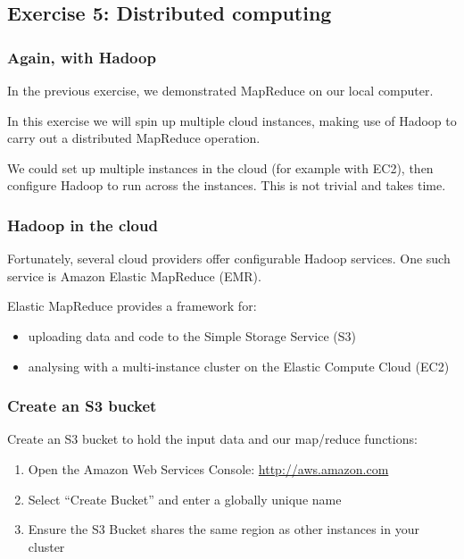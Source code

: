 \subsection{Exercise 5: Distributed
computing}\label{exercise-5-distributed-computing}

\subsubsection{Again, with Hadoop}\label{again-with-hadoop}

In the previous exercise, we demonstrated MapReduce on our local
computer.

In this exercise we will spin up multiple cloud instances, making use of
Hadoop to carry out a distributed MapReduce operation.

We could set up multiple instances in the cloud (for example with EC2),
then configure Hadoop to run across the instances. This is not trivial
and takes time.

\subsubsection{Hadoop in the cloud}\label{hadoop-in-the-cloud}

Fortunately, several cloud providers offer configurable Hadoop services.
One such service is Amazon Elastic MapReduce (EMR).

Elastic MapReduce provides a framework for:

\begin{itemize}
\itemsep1pt\parskip0pt
\item
  uploading data and code to the Simple Storage Service (S3)
\item
  analysing with a multi-instance cluster on the Elastic Compute Cloud
  (EC2)
\end{itemize}

\subsubsection{Create an S3 bucket}\label{create-an-s3-bucket}

Create an S3 bucket to hold the input data and our map/reduce functions:

\begin{enumerate}
\def\labelenumi{\arabic{enumi}.}
\itemsep1pt\parskip0pt
\item
  Open the Amazon Web Services Console:
  \href{http://aws.amazon.com/}{http://aws.amazon.com}
\item
  Select ``Create Bucket'' and enter a globally unique name
\item
  Ensure the S3 Bucket shares the same region as other instances in your
  cluster
\end{enumerate}

